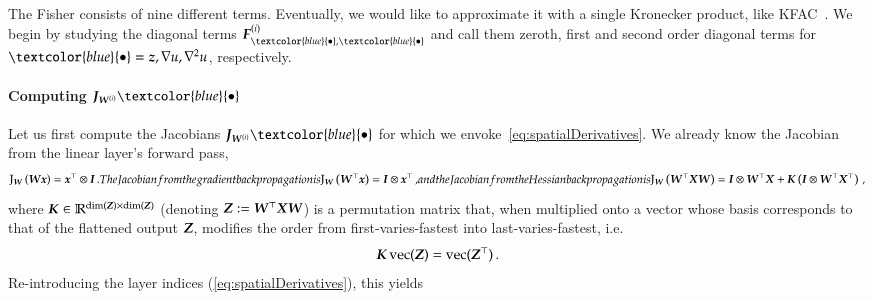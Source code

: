The Fisher consists of nine different terms.
Eventually, we would like to approximate it with a single Kronecker product, like KFAC~\citep{martens2015optimizing}.
We begin by studying the diagonal terms $\mF_{\textcolor{blue}{\bullet}, \textcolor{blue}{\bullet}}^{(i)}$ and call them zeroth, first and second order diagonal terms for $\textcolor{blue}{\bullet} = \vz, \nabla u, \nabla^2 u$, respectively.

\paragraph{Computing $\mJ_{\mW^{(i)}}\textcolor{blue}{\bullet}$}
Let us first compute the Jacobians $\mJ_{\mW^{(i)}}\textcolor{blue}{\bullet}$ for which we envoke~\eqref{eq:spatialDerivatives}.
We already know the Jacobian from the linear layer's forward pass,
\begin{subequations}\label{eq:fisher-jacobians}
  \begin{align}
    \jac_{\mW}\left( \mW \vx \right) = \vx^{\top} \otimes \mI\,.
  \end{align}
  The Jacobian from the gradient backpropagation is
  \begin{align}
    \jac_{\mW}\left( \mW^{\top} \vx \right) = \mI \otimes \vx^{\top}\,,
  \end{align}
  and the Jacobian from the Hessian backpropagation is
  \begin{align}\label{subeq:fisher-jacobians-hbp}
    \jac_{\mW}\left( \mW^{\top} \mX \mW \right)
    =
    \mI \otimes \mW^{\top}\mX
    +
    \mK \left(
    \mI
    \otimes
    \mW^{\top}\mX^{\top}
    \right)\,,
  \end{align}
\end{subequations}
where ${\boldsymbol{K}} \in {\mathbb{R}}^{\dim({\boldsymbol{Z}}) \times \dim({\boldsymbol{Z}})}$ (denoting ${\boldsymbol{Z}} := {\boldsymbol{W}}^{\top}{\boldsymbol{X}} {\boldsymbol{W}}$) is a permutation matrix that, when multiplied onto a vector whose basis corresponds to that of the flattened output ${\boldsymbol{Z}}$, modifies the order from first-varies-fastest into last-varies-fastest, i.e.
\begin{equation*}
  {\boldsymbol{K}} \operatorname{vec}({\boldsymbol{Z}}) = \operatorname{vec}({\boldsymbol{Z}}^{\top})\,.
\end{equation*}
Re-introducing the layer indices (\eqref{eq:spatialDerivatives}), this yields
